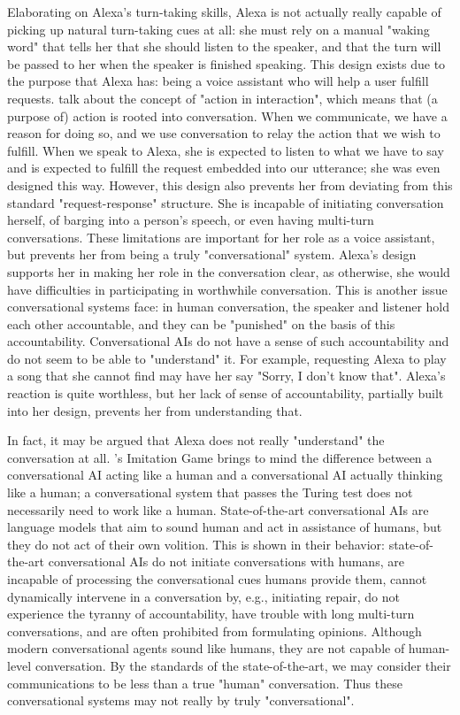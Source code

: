 \documentclass[11pt]{article}
\begin{document}
Elaborating on Alexa's turn-taking skills, Alexa is not actually really capable of picking up natural turn-taking cues at all: she must rely on a manual "waking word" that tells her that she should listen to the speaker, and that the turn will be passed to her when the speaker is finished speaking.
This design exists due to the purpose that Alexa has: being a voice assistant who will help a user fulfill requests.
\citet{enfield2017concept} talk about the concept of "action in interaction", which means that (a purpose of) action is rooted into conversation.
When we communicate, we have a reason for doing so, and we use conversation to relay the action that we wish to fulfill.
When we speak to Alexa, she is expected to listen to what we have to say and is expected to fulfill the request embedded into our utterance; she was even designed this way.
However, this design also prevents her from deviating from this standard "request-response" structure.
She is incapable of initiating conversation herself, of barging into a person's speech, or even having multi-turn conversations.
These limitations are important for her role as a voice assistant, but prevents her from being a truly "conversational" system.
Alexa's design supports her in making her role in the conversation clear, as otherwise, she would have difficulties in participating in worthwhile conversation.
This is another issue conversational systems face: in human conversation, the speaker and listener hold each other accountable, and they can be "punished" on the basis of this accountability.
Conversational AIs do not have a sense of such accountability and do not seem to be able to "understand" it.
For example, requesting Alexa to play a song that she cannot find may have her say "Sorry, I don't know that".
Alexa's reaction is quite worthless, but her lack of sense of accountability, partially built into her design, prevents her from understanding that.

In fact, it may be argued that Alexa does not really "understand" the conversation at all.
\citet{turing1950computing}'s Imitation Game brings to mind the difference between a conversational AI acting like a human and a conversational AI actually thinking like a human; a conversational system that passes the Turing test does not necessarily need to work like a human.
State-of-the-art conversational AIs are language models that aim to sound human and act in assistance of humans, but they do not act of their own volition.
This is shown in their behavior: state-of-the-art conversational AIs do not initiate conversations with humans, are incapable of processing the conversational cues humans provide them, cannot dynamically intervene in a conversation by, e.g., initiating repair, do not experience the tyranny of accountability, have trouble with long multi-turn conversations, and are often prohibited from formulating opinions.
Although modern conversational agents sound like humans, they are not capable of human-level conversation.
By the standards of the state-of-the-art, we may consider their communications to be less than a true "human" conversation.
Thus these conversational systems may not really by truly "conversational".
\end{document}

